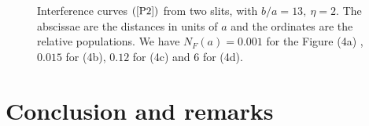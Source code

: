 \documentclass[12pt,aps,prb,preprint]{revtex4-1}   %
\begin{document}
\begin{figure}[h]
\begin{center}
\caption{\label{Fig.3} Interference curves $(\ref{P2})$ from two
slits, with $b/a=13,\ \eta=2$. The abscissae are the distances in
units of $a$ and the ordinates are the relative populations. We
have $N_F(a)=0.001$ for the Figure (4a) , $0.015$ for (4b), $0.12$
for (4c) and $6$ for (4d).}
\end{center}
\end{figure}


\section{Conclusion and remarks}
\end{document}
